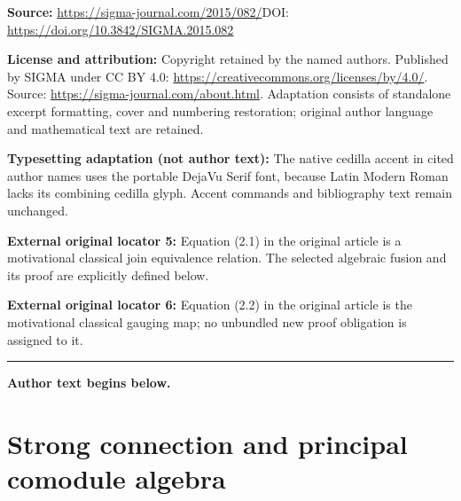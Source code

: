\documentclass[11pt]{article}
\numberwithin{equation}{section}
\begin{document}
\noindent\textbf{Source:} \url{https://sigma-journal.com/2015/082/}\quad DOI: \url{https://doi.org/10.3842/SIGMA.2015.082}\par
\noindent\textbf{License and attribution:} Copyright retained by the named authors. Published by SIGMA under CC BY 4.0: \url{https://creativecommons.org/licenses/by/4.0/}. Source: \url{https://sigma-journal.com/about.html}. Adaptation consists of standalone excerpt formatting, cover and numbering restoration; original author language and mathematical text are retained.\par
\noindent\textbf{Typesetting adaptation (not author text):} The native cedilla accent in cited author names uses the portable DejaVu Serif font, because Latin Modern Roman lacks its combining cedilla glyph. Accent commands and bibliography text remain unchanged.\par
\noindent\textbf{External original locator 5:} Equation (2.1) in the original article is a motivational classical join equivalence relation. The selected algebraic fusion and its proof are explicitly defined below.\par
\noindent\textbf{External original locator 6:} Equation (2.2) in the original article is the motivational classical gauging map; no unbundled new proof obligation is assigned to it.\par
\medskip\hrule\medskip\noindent\textbf{Author text begins below.}\par
\setcounter{section}{2}
\setcounter{subsection}{0}
\setcounter{subsubsection}{0}
\setcounter{Theorem}{0}
\setcounter{equation}{2}
\section{Strong connection and principal comodule algebra}\label{sc}
\end{document}
